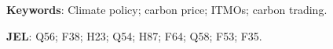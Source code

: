 \documentclass[12pt,english]{article}
\begin{document}
\begin{abstract}


\end{abstract}

\textbf{Keywords}: Climate policy; carbon price; ITMOs; carbon trading.%

\textbf{JEL}: Q56; F38; H23; Q54; H87; F64; Q58; F53; F35.

\end{document}
